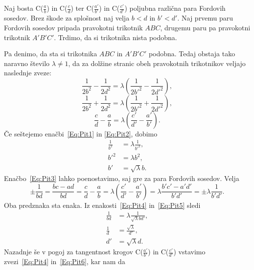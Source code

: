 \documentclass[mat1]{fmfdelo}
\begin{document}
\begin{dokaz}
%
Naj bosta C($\frac{a}{b}$) in C($\frac{c}{d}$) ter C($\frac{a'}{b'}$) in C($\frac{c'}{d'}$) poljubna različna para Fordovih sosedov. Brez škode za splošnost naj velja $b<d$ in $b'<d'$. Naj prvemu paru Fordovih sosedov pripada pravokotni trikotnik $ABC$, drugemu paru pa pravokotni trikotnik $A'B'C'$. Trdimo, da si trikotnika nista podobna.

Pa denimo, da sta si trikotnika $ABC$ in $A'B'C'$ podobna. Tedaj obstaja tako naravno število $\lambda\ne{1}$, da za dolžine stranic obeh pravokotnih trikotnikov veljajo naslednje zveze:
%
\begin{equation}
\label{Eq:Pit1}
\frac{1}{2b^2}-\frac{1}{2d^2} = \lambda \left (\frac{1}{2b'^2}-\frac{1}{2d'^2} \right ),
\end{equation}
%
\begin{equation}
\label{Eq:Pit2}
\frac{1}{2b^2}+\frac{1}{2d^2} = \lambda \left (\frac{1}{2b'^2}+\frac{1}{2d'^2} \right ),
\end{equation}
%
\begin{equation}
\label{Eq:Pit3}
\frac{c}{d}-\frac{a}{b} = \lambda \left (\frac{c'}{d'}-\frac{a'}{b'} \right ).
\end{equation}
%
Če seštejemo enačbi~\eqref{Eq:Pit1} in \eqref{Eq:Pit2}, dobimo
%
\begin{align}
\label{Eq:Pit4}
\frac{1}{b^2} &= \lambda \frac{1}{b'^2}, \nonumber \\
b'^2 &= \lambda b^2, \nonumber \\
b' &= \sqrt\lambda b.
\end{align}
%
Enačbo~\eqref{Eq:Pit3} lahko poenostavimo, saj gre za para Fordovih sosedov. Velja
\begin{equation}
\label{Eq:Pit5}
\pm \frac{1}{bd} = \frac{bc-ad}{bd} = \frac{c}{d}-\frac{a}{b} = \lambda \left (\frac{c'}{d'}-\frac{a'}{b'} \right ) = \lambda \frac{b'c'-a'd'}{b'd'} = \pm \lambda \frac{1}{b'd'}.
\end{equation}
%
Oba predznaka sta enaka. Iz enakosti~\eqref{Eq:Pit4} in~\eqref{Eq:Pit5} sledi 
%
\begin{align}
\label{Eq:Pit6}
\frac{1}{bd} &=\lambda \frac{1}{\sqrt\lambda bd'}, \nonumber \\
\frac{1}{d} &= \frac{\sqrt\lambda}{d'}, \nonumber \\
d' &= \sqrt\lambda d.
\end{align}
%
Nazadnje še v pogoj za tangentnost krogov C($\frac{a'}{b'}$) in C($\frac{c'}{d'}$) vstavimo zvezi~\eqref{Eq:Pit4} in~\eqref{Eq:Pit6}, kar nam da

\end{dokaz}
\end{document}
